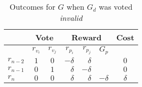 \begin{table}[hbt]
    \caption{Outcomes for $G$ when $G_d$ was voted \emph{invalid}}
    \begin{tabular}{lccrrrc}
    \toprule
                  & \multicolumn{2}{c}{Vote} & \multicolumn{3}{c}{Reward} & Cost                     \\
    \midrule
                  & $r_{v_i}$  & $r_{v_j}$   & $r_{p_i}$ & $r_{p_j}$ & $G_p$     &                   \\
    \addlinespace[0.5em]
        $r_{n-2}$ & $1$        & $0$         & $-\delta$ & $\delta$  &           & $0$               \\
        $r_{n-1}$ & $0$        & $1$         & $\delta$  & $-\delta$ &           & $0$               \\
        $r_{n}$   & $0$        & $0$         & $\delta$  & $\delta$  & $-\delta$ & $\delta$          \\
    \bottomrule
    \end{tabular}
\end{table}


